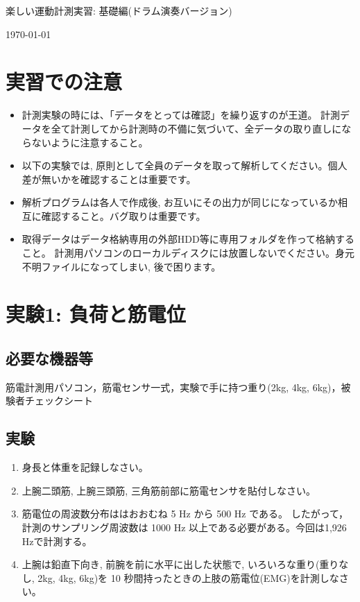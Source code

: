 \documentclass{jsarticle}
\begin{document}
\begin{center}
  {\LARGE 楽しい運動計測実習: 基礎編(ドラム演奏バージョン)}
\end{center}
\begin{flushright}
\today
\end{flushright}

\section*{実習での注意}
\begin{itemize}
\item 計測実験の時には、「データをとっては確認」を繰り返すのが王道。
  計測データを全て計測してから計測時の不備に気づいて、全データの取り直しにならないように注意すること。
\item 以下の実験では, 原則として全員のデータを取って解析してください。個人差が無いかを確認することは重要です。
\item 解析プログラムは各人で作成後, お互いにその出力が同じになっているか相互に確認すること。バグ取りは重要です。
\item 取得データはデータ格納専用の外部HDD等に専用フォルダを作って格納すること。
  計測用パソコンのローカルディスクには放置しないでください。身元不明ファイルになってしまい, 後で困ります。
\end{itemize}

\section{実験1: 負荷と筋電位}

\subsection{必要な機器等}

筋電計測用パソコン，筋電センサ一式，実験で手に持つ重り(2kg, 4kg, 6kg)，被験者チェックシート

\subsection{実験}

\begin{enumerate}
  \item 身長と体重を記録しなさい。
  \item 上腕二頭筋, 上腕三頭筋, 三角筋前部に筋電センサを貼付しなさい。
  \item 筋電位の周波数分布ははおおむね 5 Hz から 500 Hz である。
  したがって，計測のサンプリング周波数は 1000 Hz 以上である必要がある。今回は1,926 Hzで計測する。
  \item 上腕は鉛直下向き, 前腕を前に水平に出した状態で, いろいろな重り(重りなし, 2kg, 4kg, 6kg)を 10 秒間持ったときの上肢の筋電位(EMG)を計測しなさい。
\end{enumerate}  
\end{document}

